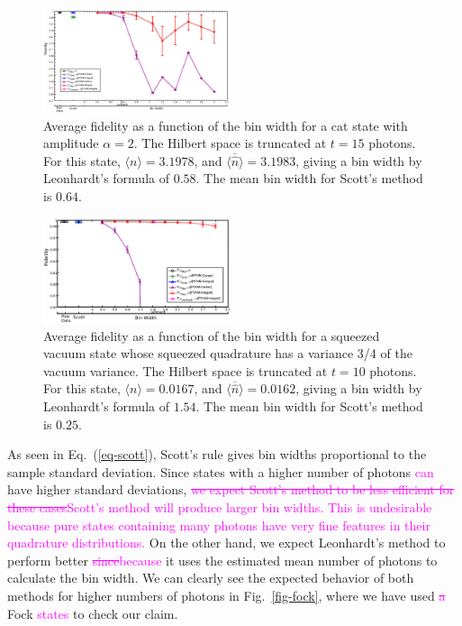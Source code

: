 \documentclass[
reprint,
superscriptaddress,
showpacs,
amsmath,
amssymb,
aps,
pra,
longbibliography
]{revtex4-1}
\providecommand{\aucmnt}[1]{#1}
\providecommand{\editcolor}[2]{\textcolor{#1}{#2}}
\providecommand{\aucmnt}[1]{}
\providecommand{\editcolor}[2]{#2}
\newcommand{\SG}[1]{\editcolor{magenta}{#1}}
\newcommand{\SGs}[1]{\aucmnt{\editcolor{magenta}{\sout{#1}}}}
\begin{document}
\begin{figure}
  \includegraphics[width=0.49\textwidth]{catstate-alpha=2-15photons.eps}
  \caption{Average fidelity as a function of the bin width for a cat
    state with amplitude $\alpha = 2$. The Hilbert space is truncated
    at $t=15$ photons. For this state, $\langle n \rangle = 3.1978$, and 
    $\overline{\langle \hat{n} \rangle}=3.1983$, giving a bin width by
    Leonhardt's formula of $0.58$.  The mean bin width for Scott's
    method is $0.64$.}
  \label{fig-Fid_vs_binwidth_catstate_alpha_2_Mph_15}
\end{figure}

\begin{figure}
  \includegraphics[width=0.49\textwidth]{squeezedvacuum-10photons-var=075.eps}
  \caption{Average fidelity as a function of the bin width for a
    squeezed vacuum state whose squeezed quadrature has a variance 3/4
    of the vacuum variance. The Hilbert space is truncated at $t=10$
    photons. For this state, $\langle n \rangle = 0.0167$, and
    $\overline{\langle \hat{n} \rangle}=0.0162$, giving a bin width by
    Leonhardt's formula of $1.54$.  The mean bin width for Scott's
    method is $0.25$.}
  \label{fig-squeezed_vacuum_variance_075_Mph_10}
\end{figure}

As seen in Eq.~(\ref{eq-scott}), Scott's rule gives bin widths
proportional to the sample standard deviation. Since states with a
higher number of photons \SG{can} have higher standard deviations,
\SGs{we expect Scott's method to be less efficient for these
  cases}\SG{Scott's method will produce larger bin widths.  This is
  undesirable because pure states containing many photons have very
  fine features in their quadrature distributions.}  On the other
hand, we expect Leonhardt's method to perform better
\SGs{since}\SG{because} it uses the estimated mean number of photons
to calculate the bin width. We can clearly see the expected behavior
of both methods for higher numbers of photons in Fig.~\ref{fig-fock},
where we have used \SGs{a} Fock \SG{states} to check our claim.
\end{document}
